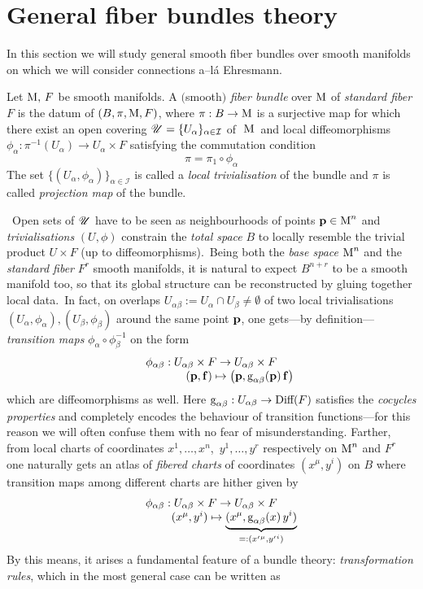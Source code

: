 \section{General fiber bundles theory}\label{gen_fib}
In this section we will study general smooth fiber bundles over smooth manifolds on which we will consider connections a--lá Ehresmann.
\begin{defi}
    Let $\text{\normalfont M},\,F$ be smooth manifolds. A $($smooth$)$ \emph{fiber bundle} over $\text{\normalfont M}$ of \emph{standard fiber} $F$ is the datum of $(B,\pi,\text{\normalfont M},F)$, where $\pi:B\to\text{\normalfont M}$ is a surjective map for which there exist an open covering $\mathscr{U}=\{U_\alpha\}_{\alpha\in\mathcal{I}}$ of \,\,$\text{\normalfont M}$\, and local diffeomorphisms $\phi_\alpha:\pi^{-1}(U_\alpha)\to U_\alpha\times F$ satisfying the commutation condition
    $$\pi=\pi_1\circ\phi_\alpha$$
    The set $\{(U_\alpha,\phi_\alpha)\}_{\alpha\in\mathcal{I}}$ is called a \emph{local trivialisation} of the bundle and $\pi$ is called \emph{projection map} of the bundle.
\end{defi}
\,\newline
Open sets of $\mathscr{U}$ have to be seen as neighbourhoods of points $\mathbf{p}\in\text{\normalfont M}^n$ and \emph{trivialisations} $(U,\phi)$ constrain the \emph{total space} $B$ to locally resemble the trivial product $U\times F$ (up to diffeomorphisms).\, Being both the \emph{base space} $\text{\normalfont M}^n$ and the \emph{standard fiber} $F^r$ smooth manifolds, it is natural to expect $B^{n+r}$ to be a smooth manifold too, so that its global structure can be reconstructed by gluing together local data.\, In fact, on overlaps $U_{\alpha\beta}:=U_\alpha\cap U_\beta\neq\emptyset$ of two local trivialisations $(U_\alpha,\phi_\alpha), (U_\beta,\phi_\beta)$ around the same point $\mathbf{p}$, one gets---by definition---\emph{transition maps} $\phi_\alpha\circ\phi_\beta^{-1}$ on the form 
$$\begin{matrix}
    \phi_{\alpha\beta}:U_{\alpha\beta}\times F\to U_{\alpha\beta}\times F\\
    \qquad\qquad\quad(\mathbf{p},\mathbf{f})\mapsto\left(\mathbf{p},\text{\normalfont g}_{\alpha\beta}(\mathbf{p})\,\mathbf{f}\right)
\end{matrix}$$
which are diffeomorphisms as well.
Here $\text{\normalfont g}_{\alpha\beta}:U_{\alpha\beta}\to\text{\normalfont Diff}(F)$ satisfies the \emph{cocycles properties} and completely encodes the behaviour of transition functions---for this reason we will often confuse them with no fear of misunderstanding. Farther, from local charts of coordinates $x^1,\hdots,x^n$,\, $y^1,\hdots,y^r$ respectively on $\text{\normalfont M}^n$ and $F^r$ one naturally gets an atlas of \emph{fibered charts} of coordinates $(x^\mu,y^i)$ on $B$ where transition maps among different charts are hither given by
$$\begin{matrix}
    \phi_{\alpha\beta}:U_{\alpha\beta}\times F\to U_{\alpha\beta}\times F\\
    \qquad\qquad (x^\mu,y^i)\mapsto\underbrace{(x^\mu,\text{\normalfont g}_{\alpha\beta}(x)\,y^i)}_{=:({x'}^\mu,{y'}^i)}
\end{matrix}$$
By this means, it arises a fundamental feature of a bundle theory: \emph{transformation rules}, which in the most general case can be written as

